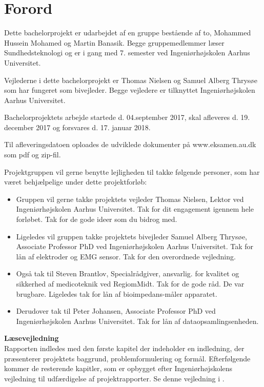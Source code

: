 \chapter{Forord}

Dette bachelorprojekt er udarbejdet af en gruppe bestående af to, Mohammed Hussein Mohamed og Martin Banasik. Begge gruppemedlemmer læser Sundhedsteknologi og er i gang med 7. semester ved Ingeniørhøjskolen Aarhus Universitet.

Vejlederne i dette bachelorprojekt er Thomas Nielsen og Samuel Alberg Thrysøe som har fungeret som bivejleder. Begge vejledere er tilknyttet Ingeniørhøjskolen Aarhus Universitet.

Bachelorprojektets arbejde startede d. 04.september 2017,  skal afleveres d. 19. december 2017 og forsvares d. 17. januar 2018.

Til afleveringsdatoen oploades de udviklede dokumenter på www.eksamen.au.dk som pdf og zip-fil. 

Projektgruppen vil gerne benytte lejligheden til takke følgende personer, som har været behjælpelige under dette projektforløb:

\begin{itemize}
\item	Gruppen vil gerne takke projektets vejleder Thomas Nielsen, Lektor  ved Ingeniørhøjskolen Aarhus Universitet. Tak for dit engagement igennem  hele forløbet. Tak for de gode ideer som du bidrog med.  

\item Ligeledes vil gruppen takke projektets bivejleder Samuel Alberg Thrysøe, Associate Professor PhD ved Ingeniørhøjskolen Aarhus Universitet. Tak for lån af elektroder og EMG sensor. Tak for den overordnede vejledning.   

\item Også tak til Steven Brantlov, Specialrådgiver, ansvarlig. for kvalitet og sikkerhed af medicoteknik ved RegiomMidt. Tak for de gode råd. De var brugbare. Ligeledes tak for lån af bioimpedans-måler apparatet.  

\item Derudover tak til Peter Johansen, Associate Professor PhD ved Ingeniørhøjskolen Aarhus Universitet. Tak for lån af dataopsamlingsenheden. 
  
\end{itemize}

\pagebreak

\textbf{Læsevejledning}\\
Rapporten indledes med den første kapitel der indeholder en indledning, der præsenterer projektets baggrund, problemformulering og formål. Efterfølgende kommer de resterende kapitler, som er opbygget efter Ingeniørhøjskolens vejledning til udfærdigelse af projektrapporter. Se denne vejledning i . 

